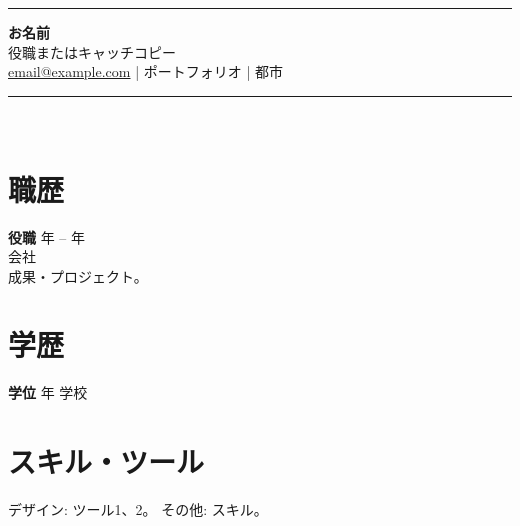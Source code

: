 \documentclass[11pt,a4paper]{article}
\begin{document}
\begin{center}\rule{2.2cm}{2.8cm}\end{center}
\begin{center}
{\LARGE \textbf{お名前}}\\[0.15em]
{\color{gray} 役職またはキャッチコピー}\\[0.4em]
\href{mailto:email@example.com}{email@example.com} \quad | \quad ポートフォリオ \quad | \quad 都市
\end{center}
\vspace{0.5em}
\noindent\rule{\textwidth}{1pt}\\[0.3em]
\section*{職歴}
\textbf{役職} \hfill 年 -- 年 \\
会社 \\
成果・プロジェクト。
\section*{学歴}
\textbf{学位} \hfill 年 \quad 学校
\section*{スキル・ツール}
デザイン: ツール1、2。 \quad その他: スキル。
\end{document}
